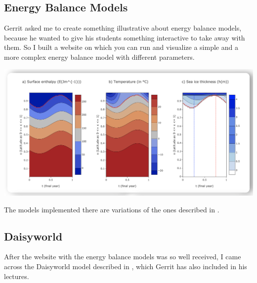 \documentclass[a0,portrait]{a0poster}
\begin{document}
\begin{multicols}{3}
\subsection{Energy Balance Models}
Gerrit asked me to create something illustrative about energy balance models, because he wanted to give his students something interactive to take away with them. So I built a website on which you can run and visualize a simple and a more complex energy balance model with different parameters.

\begin{center}\vspace{1cm}
\includegraphics[width=0.8\linewidth]{complexebm.png}
\end{center}\vspace{1cm}

The models implemented there are variations of the ones described in \cite{ebmsite}.

\subsection{Daisyworld}
After the website with the energy balance models was so well received, I came across the Daisyworld model described in \cite{daisyworld}, which Gerrit has also included in his lectures. 


\end{multicols}
\end{document}
